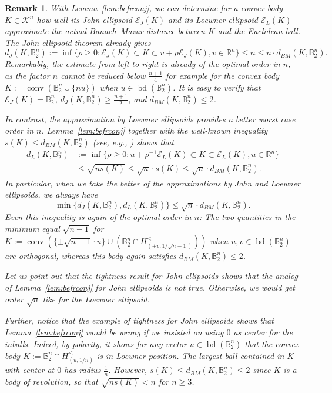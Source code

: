 \documentclass{amsart}
\newtheorem{remark}[theorem]{Remark}
\newcommand\R{\mathbb{R}}
\newcommand\B{\mathbb{B}}
\newcommand\CK{\mathcal{K}}
\newcommand\CE{\mathcal{E}}
\DeclareMathOperator{\conv}{conv}
\DeclareMathOperator{\bd}{bd}
\begin{document}
\begin{remark}\label{rem:ellipsoid_approx}
With Lemma~\ref{lem:befrconj}, we can determine for a convex body $K \in \CK^n$ how well its John ellipsoid $\CE_J(K)$ and its Loewner ellipsoid $\CE_L(K)$ approximate the actual Banach--Mazur distance between $K$ and the Euclidean ball.
The John ellipsoid theorem already gives
\[
    d_J(K,\B_2^n)
    := \inf \{ \rho \geq 0 : \CE_J(K) \subset K \subset v + \rho \CE_J(K), v \in \R^n \}
    \leq n
    \leq n \cdot d_{BM}(K,\B_2^n).
\]
Remarkably, the estimate from left to right is already of the optimal order in $n$,
as the factor $n$ cannot be reduced below $\frac{n+1}{4}$ for example for the convex body $K := \conv( \B_2^n \cup \{n u\})$ when $u \in \bd(\B_2^n)$.
It is easy to verify that $\CE_J(K) = \B_2^n$, $d_J(K,\B_2^n) \geq \frac{n+1}{2}$, and $d_{BM}(K,\B_2^n) \leq 2$.

In contrast, the approximation by Loewner ellipsoids provides a better worst case order in $n$.
Lemma~\ref{lem:befrconj} together with the well-known inequality $s(K) \leq d_{BM}(K,\B_2^n)$ (see, e.g., \cite[Proposition~$3.1$]{2017:BrandenbergGonzalezMerino}) 
shows that
\begin{align*}
    d_L(K,\B_2^n)
    & := \inf \{ \rho \geq 0 : u + \rho^{-1} \CE_L(K) \subset K \subset \CE_L(K), u \in \R^n \}
    \\
    & \leq \sqrt{n s(K)}
    \leq \sqrt{n} \cdot s(K)
    \leq \sqrt{n} \cdot d_{BM}(K,\B_2^n).
\end{align*}
In particular, when we take the better of the approximations by John and Loewner ellipsoids, we always have
\[
    \min \{ d_J(K,\B_2^n), d_L(K,\B_2^n) \}
    \leq \sqrt{n} \cdot d_{BM}(K,\B_2^n).
\]
Even this inequality is again of the optimal order in $n$:
The two quantities in the minimum equal $\sqrt{n-1}$ for
$K := \conv(\{ \pm \sqrt{n-1} \cdot u \} \cup ( \B_2^n \cap H_{(\pm v, 1/\sqrt{n-1})}^\leq ) )$ when $u,v \in \bd(\B_2^n)$ are orthogonal,
whereas this body again satisfies $d_{BM}(K,\B_2^n) \leq 2$.

Let us point out that the tightness result for John ellipsoids shows that the analog of Lemma~\ref{lem:befrconj} for John ellipsoids is \emph{not} true.
Otherwise, we would get order $\sqrt{n}$ like for the Loewner ellipsoid.

Further, notice that the example of tightness for John ellipsoids shows that Lemma~\ref{lem:befrconj} would be wrong if we insisted on using $0$ as center for the inballs.
Indeed, by polarity, it shows for any vector $u \in \bd(\B_2^n)$ that the convex body $K := \B_2^n \cap H_{(u,1/n)}^\leq$ is in Loewner position.
The largest ball contained in $K$ with center at $0$ has radius $\frac{1}{n}$.
However, $s(K) \leq d_{BM}(K,\B_2^n) \leq 2$ since $K$ is a body of revolution, so that $\sqrt{n s(K)} < n$ for $n \geq 3$.
\end{remark}
\end{document}
